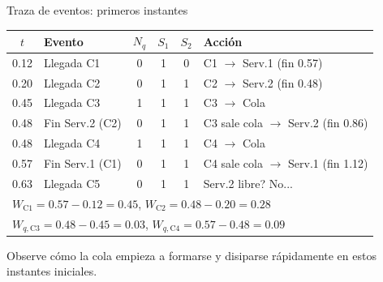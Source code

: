 \documentclass[aspectratio=1610, 9pt]{beamer}
\begin{document}
\begin{frame}{Traza de eventos: primeros instantes}

\begin{center}
\small
\renewcommand{\arraystretch}{1.15}
\begin{tabular}{clcccl}
\toprule
$t$ & \textbf{Evento} & $N_q$ & $S_1$ & $S_2$ & \textbf{Acción} \\
\midrule
0.12 & Llegada C1 & 0 & \cellcolor{blue!15}1 & 0 & C1 $\to$ Serv.1 (fin 0.57) \\
0.20 & Llegada C2 & 0 & 1 & \cellcolor{red!15}1 & C2 $\to$ Serv.2 (fin 0.48) \\
0.45 & Llegada C3 & \cellcolor{orange!20}1 & 1 & 1 & C3 $\to$ Cola \\
0.48 & Fin Serv.2 (C2) & 0 & 1 & \cellcolor{red!15}1 & C3 sale cola $\to$ Serv.2 (fin 0.86) \\
0.48 & Llegada C4 & \cellcolor{orange!20}1 & 1 & 1 & C4 $\to$ Cola \\
0.57 & Fin Serv.1 (C1) & 0 & \cellcolor{blue!15}1 & 1 & C4 sale cola $\to$ Serv.1 (fin 1.12) \\
0.63 & Llegada C5 & 0 & 1 & \cellcolor{blue!15}1 & Serv.2 libre? No... \\
\midrule
\multicolumn{6}{l}{\small $W_{\text{C1}} = 0.57 - 0.12 = 0.45$, \quad $W_{\text{C2}} = 0.48 - 0.20 = 0.28$} \\
\multicolumn{6}{l}{\small $W_{q,\text{C3}} = 0.48 - 0.45 = 0.03$, \quad $W_{q,\text{C4}} = 0.57 - 0.48 = 0.09$} \\
\bottomrule
\end{tabular}
\end{center}

\vspace{0.2cm}
Observe cómo la cola empieza a formarse y disiparse rápidamente en estos instantes iniciales.
\end{frame}
\end{document}
